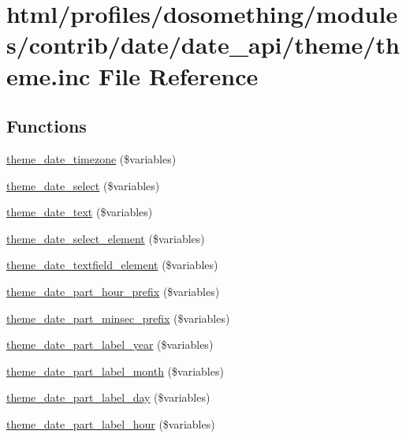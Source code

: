 \hypertarget{date_2date__api_2theme_2theme_8inc}{
\section{html/profiles/dosomething/modules/contrib/date/date\_\-api/theme/theme.inc File Reference}
\label{date_2date__api_2theme_2theme_8inc}
}
\subsection*{Functions}
\begin{DoxyCompactItemize}
\item 
\hyperlink{date_2date__api_2theme_2theme_8inc_a4aedc3082f36cba0074b2fa773e248df}{theme\_\-date\_\-timezone} (\$variables)
\item 
\hyperlink{date_2date__api_2theme_2theme_8inc_a7a7a2fac9a9d6d26c41dfa100e9150ee}{theme\_\-date\_\-select} (\$variables)
\item 
\hyperlink{date_2date__api_2theme_2theme_8inc_ae5d4bc24f64db6432fa33bbf0d89ce5b}{theme\_\-date\_\-text} (\$variables)
\item 
\hyperlink{date_2date__api_2theme_2theme_8inc_a2bfe4bbd77fc059daed2a92f9aa51736}{theme\_\-date\_\-select\_\-element} (\$variables)
\item 
\hyperlink{date_2date__api_2theme_2theme_8inc_a1bf50bb783fe2788e697d380c1cc9cce}{theme\_\-date\_\-textfield\_\-element} (\$variables)
\item 
\hyperlink{date_2date__api_2theme_2theme_8inc_a707dbcf3e6226ca43c43544811523dff}{theme\_\-date\_\-part\_\-hour\_\-prefix} (\$variables)
\item 
\hyperlink{date_2date__api_2theme_2theme_8inc_a0cfc0511719014321f866b76649bd9ac}{theme\_\-date\_\-part\_\-minsec\_\-prefix} (\$variables)
\item 
\hyperlink{date_2date__api_2theme_2theme_8inc_aa80cf0cc2785d368bd092dc38157b5d9}{theme\_\-date\_\-part\_\-label\_\-year} (\$variables)
\item 
\hyperlink{date_2date__api_2theme_2theme_8inc_a0020a59eb3f057fbe646ad3d5837082c}{theme\_\-date\_\-part\_\-label\_\-month} (\$variables)
\item 
\hyperlink{date_2date__api_2theme_2theme_8inc_a1afea8735a9cfc382697de7ce6b09fa0}{theme\_\-date\_\-part\_\-label\_\-day} (\$variables)
\item 
\hyperlink{date_2date__api_2theme_2theme_8inc_adf3fced76d9b9b01ae0efe4b83b488b9}{theme\_\-date\_\-part\_\-label\_\-hour} (\$variables)

\end{DoxyCompactItemize}
